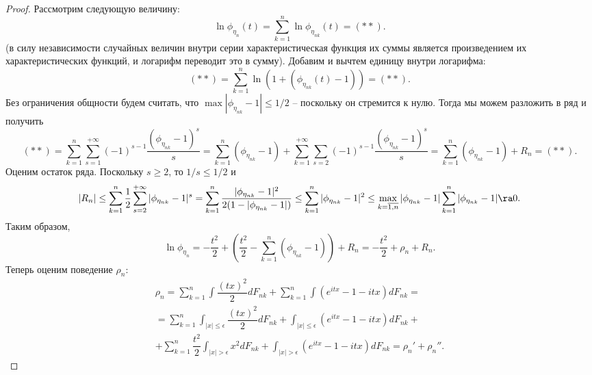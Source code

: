 \begin{proof}
    Рассмотрим следующую величину:
    \[
        \ln \phi_{\eta_n}(t) = \sum\limits_{k = 1}^{n} \ln \phi_{\eta_{nk}}(t) = (**).
    \]
    (в силу независимости случайных величин внутри серии характеристическая функция их суммы является произведением их характеристических функций, и логарифм переводит это в сумму).
    Добавим и вычтем единицу внутри логарифма:
    \[
        (**) = \sum\limits_{k = 1}^{n} \ln (1 + (\phi_{\eta_{nk}}(t) - 1)) = (**).
    \]
    Без ограничения общности будем считать, что $\max |\phi_{\eta_{nk}} - 1| \leq 1/2$ -- поскольку он стремится к нулю.
    Тогда мы можем разложить в ряд и получить
    \[
        (**) = \sum\limits_{k = 1}^{n} \sum\limits_{s = 1}^{+\infty} (-1)^{s - 1} \dfrac{(\phi_{\eta_{nk}} - 1)^s}{s} = \sum\limits_{k = 1}^{n} (\phi_{\eta_{nk}} - 1) + \sum\limits_{k = 1}^{+\infty} \sum\limits_{s = 2} (-1)^{s - 1} \dfrac{(\phi_{\eta_{nk}} - 1)^s}{s} = \sum\limits_{k = 1}^{n} (\phi_{\eta_{nk}} - 1) + R_n = (**).
    \]
    Оценим остаток ряда. Поскольку $s \geq 2$, то $1/s \leq 1/2$ и
    \[
        |R_n| \leq \sum\limits_{k = 1}^{n} \dfrac{1}{2} \sum\limits_{s = 2}^{+\infty} |\phi_{\eta_{nk}} - 1|^s = \sum\limits_{k = 1}^{n} \dfrac{|\phi_{\eta_{nk}} - 1|^2}{2(1 - |\phi_{\eta_{nk}} - 1|)} \leq \sum\limits_{k = 1}^{n} |\phi_{\eta_{nk}} - 1|^2 \leq \max\limits_{k = \overline{1, n}} |\phi_{\eta_{nk}} - 1| \sum\limits_{k = 1}^{n}|\phi_{\eta_{nk}} - 1| \ra 0.
    \]
    Таким образом,
    \[
        \ln \phi_{\eta_n} = -\dfrac{t^2}{2} + (\dfrac{t^2}{2} - \sum\limits_{k = 1}^n (\phi_{\eta_{nk}} - 1)) + R_n = -\dfrac{t^2}{2} + \rho_n + R_n.
    \]
    Теперь оценим поведение $\rho_n$:
    \begin{multline*}
        \rho_n = \sum\limits_{k = 1}^{n} \int \dfrac{(tx)^2}{2}dF_{nk} + \sum\limits_{k = 1}^{n} \int (e^{itx} - 1 - itx)dF_{nk} = \\
        = \sum\limits_{k = 1}^{n} \int_{|x| \leq \epsilon} \dfrac{(tx)^2}{2}dF_{nk} + \int_{|x| \leq \epsilon} (e^{itx} - 1 - itx)dF_{nk} + \\
        + \sum\limits_{k = 1}^{n} \dfrac{t^2}{2} \int_{|x| > \epsilon} x^2 dF_{nk} + \int_{|x| > \epsilon} (e^{itx} - 1 - itx)dF_{nk}  = \rho_n' + \rho_n''.
    \end{multline*}


\end{proof}
